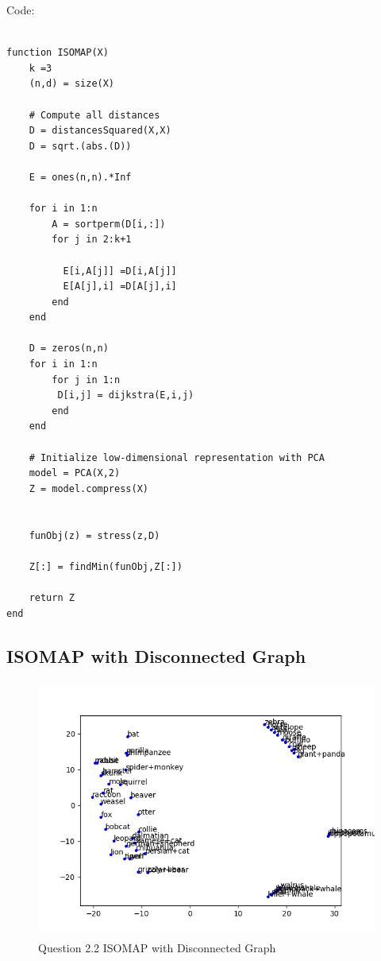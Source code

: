 \documentclass{article}
\begin{document}
Code:
\begin{verbatim}

function ISOMAP(X)
    k =3
    (n,d) = size(X)

    # Compute all distances
    D = distancesSquared(X,X)
    D = sqrt.(abs.(D))

    E = ones(n,n).*Inf

    for i in 1:n
        A = sortperm(D[i,:])
        for j in 2:k+1
          
          E[i,A[j]] =D[i,A[j]]
          E[A[j],i] =D[A[j],i]     
        end 
    end

    D = zeros(n,n)
    for i in 1:n
        for j in 1:n
         D[i,j] = dijkstra(E,i,j)
        end
    end

    # Initialize low-dimensional representation with PCA
    model = PCA(X,2)
    Z = model.compress(X)
    

    funObj(z) = stress(z,D)

    Z[:] = findMin(funObj,Z[:])

    return Z
end

\end{verbatim}



\subsection{ISOMAP with Disconnected Graph}

\begin{figure}[h!]
    \includegraphics[width=50em,height=8.5cm]{q2_2.png}
    \caption{Question 2.2 ISOMAP with Disconnected Graph}
    \label{fig:q2_2}
\end{figure}
\end{document}
